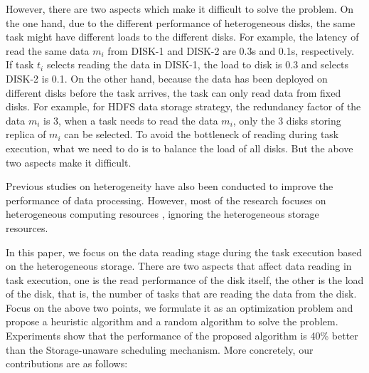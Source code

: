 \documentclass[conference]{IEEEtran}
\begin{document}
However, there are two aspects which make it difficult to solve the problem.
On the one hand, due to the different performance of heterogeneous disks, the same task might have different loads to the different disks. For example, the latency of read the same data $m_i$ from DISK-1 and DISK-2 are 0.3s and 0.1s, respectively. If task $t_i$ selects reading the data in DISK-1, the load to disk is 0.3 and selects DISK-2 is 0.1. On the other hand, because the data has been deployed on different disks before the task arrives, the task can only read data from fixed disks. For example, for HDFS data storage strategy, the redundancy factor of the data $m_i$ is 3, when a task needs to read the data $m_i$, only the 3 disks storing replica of $m_i$ can be selected. To avoid the bottleneck of reading during task execution, what we need to do is to balance the load of all disks. But the above two aspects make it difficult.


Previous studies on heterogeneity have also been conducted to improve the performance of data processing. However, most of the research focuses on heterogeneous computing resources \cite{b25}\cite{b26}, ignoring the heterogeneous storage resources.

In this paper, we focus on the data reading stage during the task execution based on the heterogeneous storage. There are two aspects that affect data reading in task execution, one is the read performance of the disk itself, the other is the load of the disk, that is, the number of tasks that are reading the data from the disk. Focus on the above two points, we formulate it as an optimization problem and propose a heuristic algorithm and a random algorithm to solve the problem. Experiments show that the performance of the proposed algorithm is 40\% better than the Storage-unaware scheduling mechanism. More concretely, our contributions are as follows: 
\end{document}
